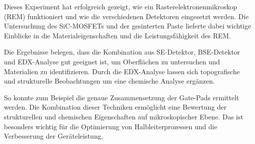 Dieses Experiment hat erfolgreich gezeigt, wie ein Rasterelektronenmikroskop (REM) funktioniert und wie die verschiedenen Detektoren eingesetzt werden. Die Untersuchung des SiC-MOSFETs und der gesinterten Paste lieferte dabei wichtige Einblicke in die Materialeigenschaften und die Leistungsfähigkeit des REM.

Die Ergebnisse belegen, dass die Kombination aus SE-Detektor, BSE-Detektor und EDX-Analyse gut geeignet ist, um Oberflächen zu untersuchen und Materialien zu identifizieren. Durch die EDX-Analyse lassen sich topografische und strukturelle Beobachtungen um eine chemische Analyse ergänzen.

So konnte zum Beispiel die genaue Zusammensetzung der Gate-Pads ermittelt werden. Die Kombination dieser Techniken ermöglicht eine Bewertung der strukturellen und chemischen Eigenschaften auf mikroskopischer Ebene. Das ist besonders wichtig für die Optimierung von Halbleiterprozessen und die Verbesserung der Geräteleistung.
